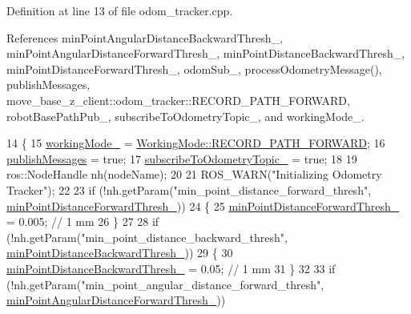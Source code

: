 Definition at line 13 of file odom\+\_\+tracker.\+cpp.



References min\+Point\+Angular\+Distance\+Backward\+Thresh\+\_\+, min\+Point\+Angular\+Distance\+Forward\+Thresh\+\_\+, min\+Point\+Distance\+Backward\+Thresh\+\_\+, min\+Point\+Distance\+Forward\+Thresh\+\_\+, odom\+Sub\+\_\+, process\+Odometry\+Message(), publish\+Messages, move\+\_\+base\+\_\+z\+\_\+client\+::odom\+\_\+tracker\+::\+R\+E\+C\+O\+R\+D\+\_\+\+P\+A\+T\+H\+\_\+\+F\+O\+R\+W\+A\+RD, robot\+Base\+Path\+Pub\+\_\+, subscribe\+To\+Odometry\+Topic\+\_\+, and working\+Mode\+\_\+.


\begin{DoxyCode}
14 \{
15     \hyperlink{classmove__base__z__client_1_1odom__tracker_1_1OdomTracker_a39c97d7bf6003fde62e0bed1a221e3f0}{workingMode\_} = \hyperlink{namespacemove__base__z__client_1_1odom__tracker_adf3e5fc3644563922cc64a20a0197224a989d06a586bcf9520889228da7faa643}{WorkingMode::RECORD\_PATH\_FORWARD};
16     \hyperlink{classmove__base__z__client_1_1odom__tracker_1_1OdomTracker_a7fa39bb2ddd9e60778687c854ea0c59c}{publishMessages} = \textcolor{keyword}{true};
17     \hyperlink{classmove__base__z__client_1_1odom__tracker_1_1OdomTracker_af07071223326ba38fc95037717102bb4}{subscribeToOdometryTopic\_} = \textcolor{keyword}{true};
18 
19     ros::NodeHandle nh(nodeName);
20 
21     ROS\_WARN(\textcolor{stringliteral}{"Initializing Odometry Tracker"});
22 
23     \textcolor{keywordflow}{if} (!nh.getParam(\textcolor{stringliteral}{"min\_point\_distance\_forward\_thresh"}, 
      \hyperlink{classmove__base__z__client_1_1odom__tracker_1_1OdomTracker_ac306033eff926950e9b9a16e05a0c639}{minPointDistanceForwardThresh\_}))
24     \{
25         \hyperlink{classmove__base__z__client_1_1odom__tracker_1_1OdomTracker_ac306033eff926950e9b9a16e05a0c639}{minPointDistanceForwardThresh\_} = 0.005; \textcolor{comment}{// 1 mm}
26     \}
27 
28     \textcolor{keywordflow}{if} (!nh.getParam(\textcolor{stringliteral}{"min\_point\_distance\_backward\_thresh"}, 
      \hyperlink{classmove__base__z__client_1_1odom__tracker_1_1OdomTracker_afdcfc389baa89c5583bf32bf5fdc7e16}{minPointDistanceBackwardThresh\_}))
29     \{
30         \hyperlink{classmove__base__z__client_1_1odom__tracker_1_1OdomTracker_afdcfc389baa89c5583bf32bf5fdc7e16}{minPointDistanceBackwardThresh\_} = 0.05; \textcolor{comment}{// 1 mm}
31     \}
32 
33     \textcolor{keywordflow}{if} (!nh.getParam(\textcolor{stringliteral}{"min\_point\_angular\_distance\_forward\_thresh"}, 
      \hyperlink{classmove__base__z__client_1_1odom__tracker_1_1OdomTracker_a8675c1d9bd1713d46a467d4aa1aa29a2}{minPointAngularDistanceForwardThresh\_}))

\end{DoxyCode}

